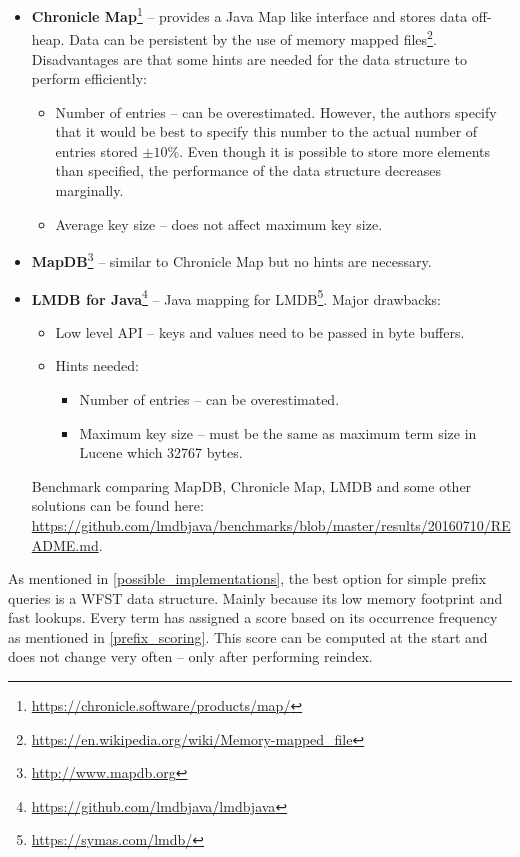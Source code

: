 \begin{itemize}
    \item \textbf{Chronicle Map}\footnote{\url{https://chronicle.software/products/map/}} – provides a Java Map like
    interface and stores data off-heap. Data can be persistent by the use of memory mapped
    files\footnote{\url{https://en.wikipedia.org/wiki/Memory-mapped\_file}}. Disadvantages are that some hints are
    needed for the data structure to perform efficiently:
    \begin{itemize}
        \item Number of entries – can be overestimated. However, the authors specify that it would be best to specify
        this number to the actual number of entries stored $\pm 10\%$. Even though it is possible to store more elements
        than specified, the performance of the data structure decreases marginally.
        \item Average key size – does not affect maximum key size.
    \end{itemize}

    \item \textbf{MapDB}\footnote{\url{http://www.mapdb.org}} – similar to Chronicle Map but no hints are necessary.

    \item \textbf{LMDB for Java}\footnote{\url{https://github.com/lmdbjava/lmdbjava}} – Java mapping for
    LMDB\footnote{\url{https://symas.com/lmdb/}}. Major drawbacks:
    \begin{itemize}
        \item Low level API – keys and values need to be passed in byte buffers.
        \item Hints needed:
            \begin{itemize}
                \item Number of entries – can be overestimated.
                \item Maximum key size – must be the same as maximum term size in Lucene which 32767 bytes.
            \end{itemize}
    \end{itemize}

    Benchmark comparing MapDB, Chronicle Map, LMDB and some other solutions can be found here:
    \url{https://github.com/lmdbjava/benchmarks/blob/master/results/20160710/README.md}.

\end{itemize}

As mentioned in \ref{possible_implementations}, the best option for simple prefix queries is a WFST data structure.
Mainly because its low memory footprint and fast lookups.
Every term has assigned a score based on its occurrence frequency as mentioned in \ref{prefix_scoring}. This score
can be computed at the start and does not change very often – only after performing reindex.

